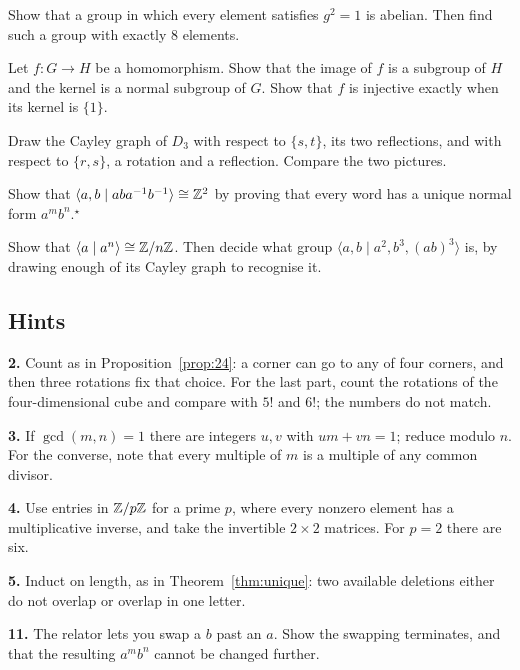 \begin{prob}
Show that a group in which every element satisfies $g^2=1$ is abelian. Then find such a group with
exactly $8$ elements.
\end{prob}

\begin{prob}
Let $f:G\to H$ be a homomorphism. Show that the image of $f$ is a subgroup of $H$ and the kernel is
a normal subgroup of $G$. Show that $f$ is injective exactly when its kernel is $\{1\}$.
\end{prob}

\begin{prob}\label{prob:cayleyD3}
Draw the Cayley graph of $D_3$ with respect to $\{s,t\}$, its two reflections, and with respect to
$\{r,s\}$, a rotation and a reflection. Compare the two pictures.
\end{prob}

\begin{prob}
Show that $\langle a,b\mid aba^{-1} b^{-1}\rangle\cong\mathbb{Z}^2$ by proving that every word has a unique
normal form $a^mb^n$.$^\star$
\end{prob}

\begin{prob}
Show that $\langle a\mid a^n\rangle\cong\mathbb{Z}/n\mathbb{Z}$. Then decide what group
$\langle a,b\mid a^2, b^3, (ab)^3\rangle$ is, by drawing enough of its Cayley graph to recognise it.
\end{prob}

\subsection*{Hints}

\noindent\textbf{2.} Count as in Proposition~\ref{prop:24}: a corner can go to any of four corners,
and then three rotations fix that choice. For the last part, count the rotations of the
four-dimensional cube and compare with $5!$ and $6!$; the numbers do not match.

\noindent\textbf{3.} If $\gcd(m,n)=1$ there are integers $u,v$ with $um+vn=1$; reduce modulo $n$.
For the converse, note that every multiple of $m$ is a multiple of any common divisor.

\noindent\textbf{4.} Use entries in $\mathbb{Z}/p\mathbb{Z}$ for a prime $p$, where every nonzero element has a
multiplicative inverse, and take the invertible $2\times2$ matrices. For $p=2$ there are six.

\noindent\textbf{5.} Induct on length, as in Theorem~\ref{thm:unique}: two available deletions
either do not overlap or overlap in one letter.

\noindent\textbf{11.} The relator lets you swap a $b$ past an $a$. Show the swapping terminates, and
that the resulting $a^mb^n$ cannot be changed further.
